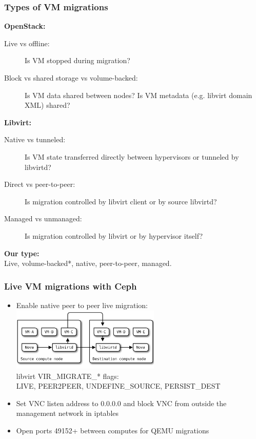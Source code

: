 \documentclass[hyperref=unicode,utf8,xcolor=pst,aspectratio=169]{beamer}
\begin{document}
\begin{frame}
	\frametitle{Types of VM migrations}
	{\bf OpenStack:}
	\begin{description}
		\item [Live vs offline:] Is VM stopped during migration?
		\item [Block vs shared storage vs volume-backed:] Is VM
			data shared between nodes? Is VM metadata
			(e.g. libvirt domain XML) shared?
	\end{description}

	{\bf Libvirt:}
	\begin{description}
		\item [Native vs tunneled:] Is VM state transferred
			directly between hypervisors or tunneled by
			libvirtd?
		\item [Direct vs peer-to-peer:] Is migration controlled
			by libvirt client or by source libvirtd?
		\item [Managed vs unmanaged:] Is migration controlled by
			libvirt or by hypervisor itself?
	\end{description}

	{\bf Our type:}\\
	Live, volume-backed*, native, peer-to-peer, managed.
\end{frame}

\begin{frame}
	\frametitle{Live VM migrations with Ceph}
	\begin{itemize}
		\item Enable native peer to peer live migration:\\
			\includegraphics[height=3cm]{libvirt-p2p-migration}\\
			libvirt VIR\_MIGRATE\_* flags:\\
			LIVE, PEER2PEER, UNDEFINE\_SOURCE, PERSIST\_DEST
		\item Set VNC listen address to 0.0.0.0 and block VNC
			from outside the management network in iptables
		\item Open ports 49152+ between computes for QEMU
			migrations
	\end{itemize}
\end{frame}
\end{document}
